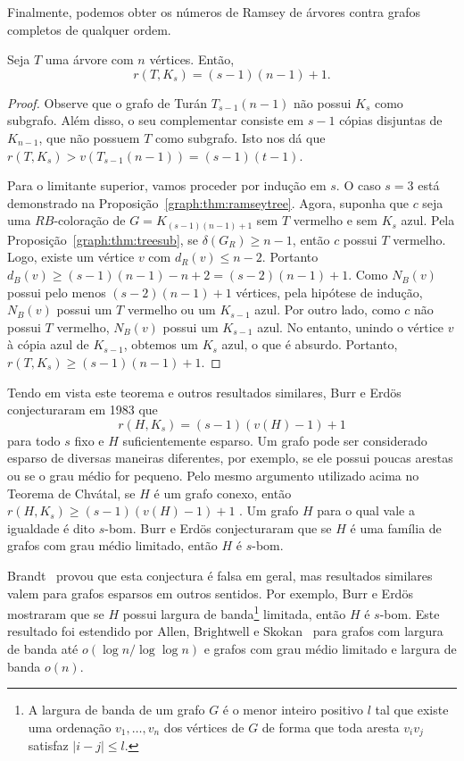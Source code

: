 Finalmente, podemos obter os números de Ramsey de árvores contra grafos completos de qualquer ordem.

\begin{theorem}
\label{graph:thm:chvatal}
Seja $T$ uma árvore com $n$ vértices. Então,
\[r(T,K_s) = (s-1)(n-1) + 1.\]
\end{theorem}
\begin{proof}
Observe que o grafo de Turán $T_{s-1}(n-1)$ não possui $K_s$ como subgrafo. Além disso, o seu complementar consiste em $s-1$ cópias disjuntas de $K_{n-1}$, que não possuem $T$ como subgrafo. Isto nos dá que $r(T,K_s) > v(T_{s-1}(n-1)) = (s-1)(t-1)$.

Para o limitante superior, vamos proceder por indução em $s$. O caso $s = 3$ está demonstrado na Proposição~\ref{graph:thm:ramseytree}. Agora, suponha que $c$ seja uma $RB$-coloração de $G = K_{(s-1)(n-1) + 1}$ sem $T$ vermelho e sem $K_s$ azul.
Pela Proposição~\ref{graph:thm:treesub}, se $\delta(G_R) \geq n-1$, então $c$ possui $T$ vermelho. Logo, existe um vértice $v$ com $d_R(v) \leq n - 2$. Portanto $d_B(v) \geq (s-1)(n-1) - n + 2 = (s-2)(n-1) + 1$.
Como $N_B(v)$ possui pelo menos $(s-2)(n-1) + 1$ vértices, pela hipótese de indução, $N_B(v)$ possui um $T$ vermelho ou um $K_{s-1}$ azul. Por outro lado, como $c$ não possui $T$ vermelho, $N_B(v)$ possui um $K_{s-1}$ azul. No entanto, unindo o vértice $v$ à cópia azul de $K_{s-1}$, obtemos um $K_s$ azul, o que é absurdo. Portanto, $r(T,K_s) \geq (s-1)(n-1) + 1$.
\end{proof}

Tendo em vista este teorema e outros resultados similares, Burr e Erdös~\cite{burr1983generalizations} conjecturaram em 1983 que
\[ r(H,K_s) = (s-1)(v(H) - 1) + 1\]
para todo $s$ fixo e $H$ suficientemente esparso. Um grafo pode ser considerado esparso de diversas maneiras diferentes, por exemplo, se ele possui poucas arestas ou se o grau médio for pequeno. Pelo mesmo argumento utilizado acima no Teorema de Chvátal, se $H$ é um grafo conexo, então $r(H,K_s) \geq (s-1)(v(H) - 1) + 1$ . Um grafo $H$ para o qual vale a igualdade é dito $s$-bom.
Burr e Erdös conjecturaram que se $H$ é uma família de grafos com grau médio limitado, então $H$ é $s$-bom.

Brandt~\cite{brandty1996expanding} provou que esta conjectura é falsa em geral, mas resultados similares valem para grafos esparsos em outros sentidos. Por exemplo, Burr e Erdös mostraram que se $H$ possui largura de banda\footnote{A largura de banda de um grafo $G$ é o menor inteiro positivo $l$ tal que existe uma ordenação $v_1, \dots, v_n$ dos vértices de $G$ de forma que toda aresta $v_i v_j$ satisfaz $|i - j| \leq l$.} limitada, então $H$ é $s$-bom. Este resultado foi estendido por Allen, Brightwell e Skokan~\cite{allen2013ramsey} para grafos com largura de banda até $o(\log n / \log \log n)$ e grafos com grau médio limitado e largura de banda $o(n)$.

